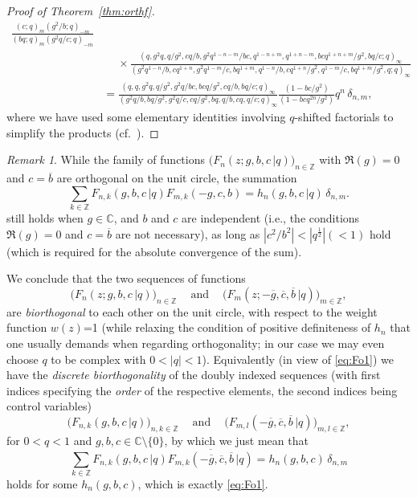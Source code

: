 \documentclass[reqno,12pt]{amsart}
\theoremstyle{remark}
\newtheorem{remark}{Remark}
\numberwithin{equation}{section}
\newcommand{\Z}{\mathbb Z}
\newcommand{\C}{\mathbb C}
\begin{document}
\begin{proof}[Proof of Theorem~\ref{thm:orthf}]
\begin{align*}
    \frac{(c;q)_{m}(g^2/b;q)_{-m}}{(bq;q)_{m}(g^2q/c;q)_{-m}}\\
  &\quad\;\times\frac{(q,g^2q,q/g^2,cq/b,g^2q^{1-n-m}/bc,
    q^{1-n+m},q^{1+n-m},bcq^{1+n+m}/g^2,bq/c;q)_{\infty}}
    {(g^2q^{1-n}/b,cq^{1+n},g^2q^{1-m}/c,bq^{1+m},q^{1-n}/b,
    cq^{1+n}/g^2,q^{1-m}/c,bq^{1+m}/g^2,q;q)_{\infty}}\\
  &= \frac{(q,q,g^2q,q/g^2,g^2q/bc,bcq/g^2,cq/b,bq/c;q)_\infty}
    {(g^2q/b,bq/g^2,g^2q/c,cq/g^2,bq,q/b,cq,q/c;q)_\infty}
    \frac{(1-bc/g^2)}{(1-bcq^{2n}/g^2)}q^n\,\delta_{n,m},
\end{align*}
where we have used some elementary identities
involving $q$-shifted factorials to simplify the products
(cf.\ \cite[Appendix~I]{GR}).
\end{proof}

\begin{remark}
While the family of functions $\big(F_n(z;g,b,c\,|q)\big)_{n\in\Z}$
with $\Re(g)=0$ and $c=\overline{b}$ are orthogonal
on the unit circle, the summation
\begin{equation}\label{eq:Fo1}
\sum_{k\in\Z}F_{n,k}(g,b,c\,|q)F_{m,k}(-g,c,b)=h_n(g,b,c\,|q)\,\delta_{n,m}.
\end{equation}
still holds when $g\in\C$, and $b$ and $c$ are independent
(i.e., the conditions $\Re(g)=0$ and
$c=\overline{b}$ are not necessary), as long as
$|c^2/b^2|<|q^{\frac 12}|(<1)$ hold (which is required
for the absolute convergence of the sum).

We conclude that the two sequences of functions
\begin{equation}\label{eq:orel}
\big(F_n(z;g,b,c\,|q)\big)_{n\in\Z}\quad\ \text{and}\quad\ 
\big(F_m(z;-\overline{g},\overline{c},\overline{b}\,|q)\big)_{m\in\Z},
\end{equation}
are \textit{biorthogonal} to each other
on the unit circle, with respect to the weight function $w(z)$=1
(while relaxing the condition of positive definiteness
of $h_n$ that one usually demands when regarding orthogonality;
in our case we may even choose $q$ to be complex with $0<|q|<1$).
Equivalently (in view of \eqref{eq:Fo1})
we have the \textit{discrete biorthogonality}
of the doubly indexed
sequences (with first indices specifying the \textit{order}
of the respective elements, the second indices being control variables)
\begin{equation*}
\big(F_{n,k}(g,b,c\,|q)\big)_{n,k\in\Z}\quad\ \text{and}\quad\ 
\big(F_{m,l}(-\overline{g},\overline{c},\overline{b}\,|q)\big)_{m,l\in\Z},
\end{equation*}
for $0<q<1$ and $g,b,c\in\C\setminus\{0\}$,
by which we just mean that
$$\sum_{k\in\Z}F_{n,k}(g,b,c\,|q)
\overline{F_{m,k}(-\overline{g},\overline{c},\overline{b}\,|q)}
=h_n(g,b,c)\,\delta_{n,m}$$
holds for some $h_n(g,b,c)$,
which is exactly \eqref{eq:Fo1}.
\end{remark}
\end{document}
